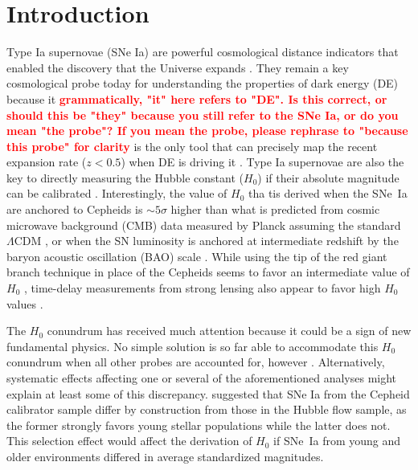 \documentclass[]{aa}
\newcommand{\LEt}[1]{\textcolor{red}{\textbf{ #1}}}
\begin{document}
\section{Introduction}

Type Ia supernovae (SNe Ia) are powerful cosmological distance indicators that
enabled the discovery that the Universe expands
\citep{riess1998, perlmutter1999}. They remain a key cosmological probe today for
understanding the properties of dark energy (DE) because it\LEt{grammatically, "it" here refers to "DE". Is this correct, or should this be "they" because you still refer to the SNe Ia, or do you mean "the probe"? If you mean the probe, please rephrase to "because this probe" for clarity} is the only tool that can
precisely map the recent expansion rate ($z<0.5$) when DE is driving it
\citep[e.g.,][]{scolnicastro2020}. Type Ia supernovae are also the key to directly measuring the
Hubble constant ($H_0$) if their absolute magnitude can be calibrated
\citep{riess2016, freedman2019}. Interestingly, the value of $H_0$ tha tis derived when
the SNe~Ia are anchored to Cepheids \citep[the\LEt{please provide the spelled-out versions of all instruments and surveys at first occurrence. If this interrupts the flow of the sentence too much, it may be done as a footnote} SH0ES
project,][]{riess2009, riess2016} is $\sim5\sigma$ higher than what is predicted
from cosmic microwave background (CMB) data measured by Planck assuming the
standard $\Lambda$CDM \citep{planck2018, riess2019, reid2019}, or when the SN
luminosity is anchored at intermediate redshift by the baryon acoustic
oscillation (BAO) scale \citep{feeney2019}. While using the tip of the red giant
branch technique in place of the Cepheids seems to favor an intermediate value of
$H_0$ \citep{freedman2019, freedman2020}, time-delay measurements from strong
lensing also appear to favor high $H_0$ values \citep{wong2019}.

The $H_0$ conundrum has received much attention because it could be a sign of new
fundamental physics. No simple solution is so far able to accommodate this $H_0$
conundrum when all other probes are accounted for, however \citep{knox2019}. Alternatively,
systematic effects affecting one or several of the aforementioned analyses
might explain at least some of this discrepancy. \cite{rigault2015}
suggested that SNe Ia from the Cepheid calibrator sample differ by construction
from those in the Hubble flow sample, as the former strongly favors
young stellar populations while the latter does not. This selection
effect would affect the derivation of $H_0$ if SNe~Ia from young and older
environments differed in average standardized magnitudes. 
\end{document}
